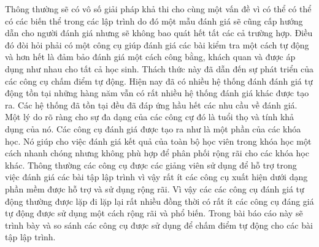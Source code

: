 \documentclass[12pt,a4paper]{article}
\begin{document}
\indent Thông thường sẽ có vô số giải pháp khả thi cho cùng một vấn đề vì có thể có thể có các biến thể trong các lập trình do đó một mẫu đánh giá sẽ cũng cấp hướng dẫn cho người đánh giá nhưng sẽ không bao quát hết tất các cả trường hợp. Điều đó đòi hỏi phải có một công cụ giúp đánh giá các bài kiểm tra một cách tự động và hơn hết là đảm bảo đánh giá một cách công bằng, khách quan và được áp dụng như nhau cho tất cả học sinh. Thách thức này đã dẫn đến sự phát triển của các công cụ chấm điểm tự động.\newline
\indent Hiện nay đã có nhiều hệ thống đánh đánh giá tự động tồn tại những hàng năm vẫn có rất nhiều hệ thống đánh giá khác được tạo ra. Các hệ thống đã tồn tại đều đã đáp ứng hầu hết các nhu cầu về đánh giá.
Một lý do rõ ràng cho sự đa dạng của các công cự đó là tuổi thọ và tính khả dụng của nó. Các công cụ đánh giá được tạo ra như là một phần của các khóa học. Nó giúp cho việc đánh giá kết quả của toàn bộ học viên trong khóa học một cách nhanh chóng nhưng không phù hợp để phân phối rộng rãi cho các khóa học khác. Thông thường các công cụ được các giảng viên sử dụng để hỗ trợ trong việc đánh giá các bài tập lập trình vì vậy rất ít các công cụ xuất hiện dưới dạng phần mềm được hỗ trợ và sử dụng rộng rãi. Vì vậy các các công cụ đánh giá tự động thường được lặp đi lặp lại rất nhiều đồng thời có rất ít các công cụ đáng giá tự động được sử dụng một cách rộng rãi và phổ biến.\newline
\indent  Trong bài báo cáo này sẽ trình bày và so sánh các công cụ được sử dụng để chấm điểm tự động cho các bài tập lập trình.\newline
\end{document}
